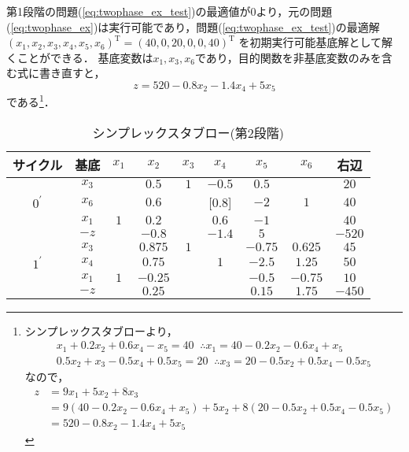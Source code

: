 \documentclass{jsreport}
\begin{document}
第1段階の問題(\ref{eq:twophase_ex_test})の最適値が$0$より，元の問題(\ref{eq:twophase_ex})は実行可能であり，問題(\ref{eq:twophase_ex_test})の最適解
$(x_1, x_2, x_3, x_4, x_5, x_6)^{\mathrm{T}} = (40, 0, 20, 0, 0, 40)^{\mathrm{T}}$
を初期実行可能基底解として解くことができる．
基底変数は$x_1, x_3, x_6$であり，目的関数を非基底変数のみを含む式に書き直すと，
\begin{equation}\label{eq:two_obj}
  z = 520 - 0.8 x_2 - 1.4 x_4 + 5 x_5
\end{equation}
である\footnote{
シンプレックスタブローより，
\begin{align}
  x_1 + 0.2 x_2 + 0.6 x_4 - x_5 = 40 \; \; \therefore x_1 = 40 - 0.2 x_2 - 0.6 x_4 + x_5 \nonumber \\
  0.5 x_2 + x_3 - 0.5 x_4 + 0.5 x_5 = 20 \; \; \therefore x_3 = 20 - 0.5 x_2 + 0.5 x_4 - 0.5 x_5 \nonumber
\end{align}
なので，
\begin{align}
  z &= 9x_1 + 5x_2 + 8x_3 \nonumber \\
  &= 9(40 - 0.2x_2 - 0.6x_4 + x_5) + 5x_2 + 8(20 - 0.5 x_2 + 0.5 x_4 - 0.5 x_5) \nonumber \\
  &= 520 - 0.8 x_2 - 1.4 x_4 + 5 x_5 \nonumber
\end{align}
}．

\begin{table}[htb]
  \centering
    \caption{シンプレックスタブロー(第2段階)}
    \begin{tabular}{c|c|cccccc|c}
    サイクル & 基底     & $x_1$ & $x_2$ & $x_3$ & $x_4$ & $x_5$ & $x_6$ & 右辺  \\ \hline
            & $x_3$   &       & $0.5$ & $1$   & $-0.5$& $0.5$ &       & $20$ \\
$0^{\prime}$& $x_6$   &       & $0.6$ &       &[$0.8$]& $-2$  &$1$    & $40$ \\
            & $x_1$   & $1$   & $0.2$ &       &  $0.6$&  $-1$ &       & $40$ \\ \cline{2-9}
            & $-z$    &       & $-0.8$&       & $-1.4$& $5$   &       & $-520$  \\ \hline

            & $x_3$   &       &$0.875$& $1$   &       &$-0.75$&$0.625$& $45$ \\
$1^{\prime}$& $x_4$   &       & $0.75$&       & $1$   & $-2.5$&$1.25$ & $50$ \\
            & $x_1$   & $1$   &$-0.25$&       &       & $-0.5$&$-0.75$& $10$ \\ \cline{2-9}
            & $-z$    &       & $0.25$&       &       & $0.15$& $1.75$& $-450$  \\ \hline
    \end{tabular}
    \label{tab:twophase_phase2}
\end{table}
\end{document}
